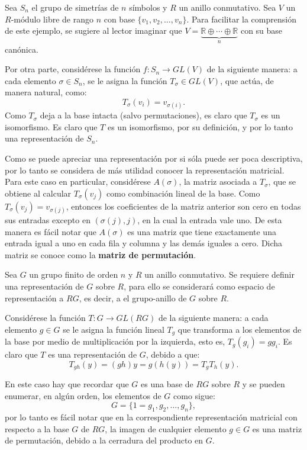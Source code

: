 \begin{ejemplo}
Sea $S_n$ el grupo de simetrías de $n$ símbolos y $R$ un anillo conmutativo. Sea $V$ un $R\mbox{-módulo}$ libre de rango $n$ con base $\{v_1, v_2, \dots, v_n\}$. Para facilitar la comprensión de este ejemplo, se sugiere al lector imaginar que $V = \underset{n}{\underbrace{\mathds{R} \oplus \cdots \oplus \mathds{R}}}$ con su base canónica. 

Por otra parte, considérese la función $f \colon S_n \to GL(V)$ de la siguiente manera: a cada elemento $\sigma 
\in S_n$, se le asigna la función $T_{\sigma} \in GL(V)$, que actúa, de manera natural, como:
\[T_{\sigma}(v_i) = v_{\sigma(i)}.\]
Como $T_{\sigma}$ deja a la base intacta (salvo permutaciones), es claro que $T_\sigma$ es un isomorfismo. Es claro que $T$ es un isomorfismo, por su definición, y por lo tanto una representación de $S_n$.

Como se puede apreciar una representación por si sóla puede ser poca descriptiva, por lo tanto se considera de más utilidad conocer la representación matricial. Para este caso en particular, considérese $A(\sigma)$, la matriz asociada a $T_{\sigma}$, que se obtiene al calcular $T_{\sigma}(v_j)$ como combinación lineal de la base. Como $T_{\sigma} (v_j) = v_{\sigma(j)}$, entonces los coeficientes de la matriz anterior son cero en todas sus entradas excepto en $(\sigma(j),j)$, en la cual la entrada vale uno. De esta manera es fácil notar que $A(\sigma)$ es una matriz que tiene exactamente una entrada igual a uno en cada fila y columna y las demás iguales a cero. Dicha matriz se conoce como la \textbf{matriz de permutación}.
\end{ejemplo}
\begin{ejemplo}
Sea $G$ un grupo finito de orden $n$ y $R$ un anillo conmutativo. Se requiere definir una representación de $G$ sobre $R$, para ello se considerará  como espacio de representación a $RG$, es decir, a el grupo-anillo de $G$ sobre $R$. 

Considérese la función $T \colon G \to GL(RG)$ de la siguiente manera: a cada elemento $g \in G$ se le asigna la función lineal $T_g$ que transforma a los elementos de la base por medio de multiplicación por la izquierda, esto es, $T_g(g_i) = gg_i$. Es claro que $T$ es una representación de $G$, debido a que:
\begin{equation*} T_{gh}(y) = (gh)y = g(h(y)) = T_gT_h(y).  \end{equation*}

 
En este caso hay que recordar que $G$ es una base de $RG$ sobre $R$ y se pueden enumerar, en algún orden, los elementos de $G$ como sigue:
\begin{equation*} 
G = \{ 1=g_1, g_2, \dots, g_n \}, 
\end{equation*}  por lo tanto es fácil notar que en la correspondiente representación matricial con respecto a la base $G$ de $RG$, la imagen de cualquier elemento $g \in G$ es una matriz de permutación, debido a la cerradura del producto en $G$. 
\end{ejemplo}
